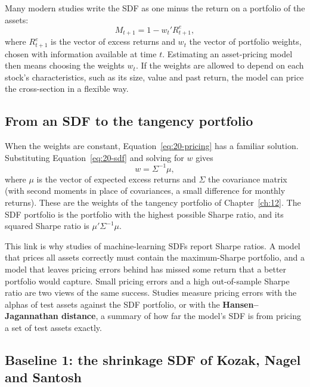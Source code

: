Many modern studies write the SDF as one minus the return on a portfolio of the assets:
\begin{equation}
  M_{t+1} = 1 - w_t' R^e_{t+1},
  \label{eq:20-sdf}
\end{equation}
where $R^e_{t+1}$ is the vector of excess returns and $w_t$ the vector of portfolio weights, chosen with information available at time $t$. Estimating an asset-pricing model then means choosing the weights $w_t$. If the weights are allowed to depend on each stock's characteristics, such as its size, value and past return, the model can price the cross-section in a flexible way.

\subsection{From an SDF to the tangency portfolio}

When the weights are constant, Equation~\eqref{eq:20-pricing} has a familiar solution. Substituting Equation~\eqref{eq:20-sdf} and solving for $w$ gives
\begin{equation}
  w = \Sigma^{-1} \mu,
  \label{eq:20-tangency}
\end{equation}
where $\mu$ is the vector of expected excess returns and $\Sigma$ the covariance matrix (with second moments in place of covariances, a small difference for monthly returns). These are the weights of the tangency portfolio of Chapter~\ref{ch:12}. The SDF portfolio is the portfolio with the highest possible Sharpe ratio, and its squared Sharpe ratio is $\mu'\Sigma^{-1}\mu$.

This link is why studies of machine-learning SDFs report Sharpe ratios. A model that prices all assets correctly must contain the maximum-Sharpe portfolio, and a model that leaves pricing errors behind has missed some return that a better portfolio would capture. Small pricing errors and a high out-of-sample Sharpe ratio are two views of the same success. Studies measure pricing errors with the alphas of test assets against the SDF portfolio, or with the \textbf{Hansen--Jagannathan distance}, a summary of how far the model's SDF is from pricing a set of test assets exactly.

\subsection{Baseline 1: the shrinkage SDF of Kozak, Nagel and Santosh}

